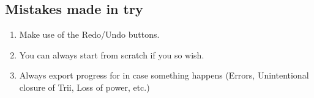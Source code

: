 \documentclass[12pt]{article}
\begin{document}
\subsection{Mistakes made in try}
    \begin{enumerate}
    	\item Make use of the Redo/Undo buttons.
      \item You can always start from scratch if you so wish.
      \item Always export progress for in case something happens (Errors, Unintentional closure of Trii, Loss of power, etc.)
    \end{enumerate}
    
\end{document}
